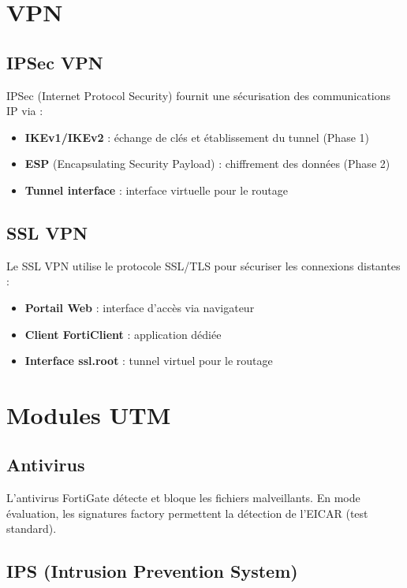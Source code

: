 \section{VPN}

\subsection{IPSec VPN}

IPSec (Internet Protocol Security) fournit une sécurisation des communications IP via \cite{3}:
\begin{itemize}
    \item \textbf{IKEv1/IKEv2} : échange de clés et établissement du tunnel (Phase 1)
    \item \textbf{ESP} (Encapsulating Security Payload) : chiffrement des données (Phase 2)
    \item \textbf{Tunnel interface} : interface virtuelle pour le routage
\end{itemize}

\subsection{SSL VPN}

Le SSL VPN utilise le protocole SSL/TLS pour sécuriser les connexions distantes \cite{4}:
\begin{itemize}
    \item \textbf{Portail Web} : interface d'accès via navigateur
    \item \textbf{Client FortiClient} : application dédiée
    \item \textbf{Interface ssl.root} : tunnel virtuel pour le routage
\end{itemize}

\section{Modules UTM}

\subsection{Antivirus}

L'antivirus FortiGate détecte et bloque les fichiers malveillants. En mode évaluation, les signatures factory permettent la détection de l'EICAR (test standard).

\subsection{IPS (Intrusion Prevention System)}

